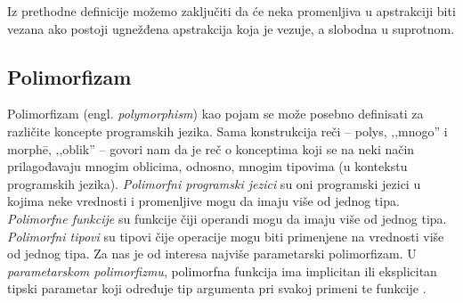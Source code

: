 Iz prethodne definicije možemo zaključiti da će neka promenljiva u apstrakciji biti vezana ako postoji ugnežđena apstrakcija koja je vezuje, a slobodna u suprotnom.

\subsection{Polimorfizam}
\label{subsec:polimorfizam}


Polimorfizam (engl. \textit{polymorphism}) kao pojam se može posebno definisati za različite koncepte programskih jezika. Sama konstrukcija reči -- polys, ‚‚mnogo'' i morph\={e}, ‚‚oblik'' -- govori nam da je reč o konceptima koji se na neki način prilagođavaju mnogim oblicima, odnosno, mnogim tipovima (u kontekstu programskih jezika). \textit{Polimorfni programski jezici} su oni programski jezici u kojima neke vrednosti i promenljive mogu da imaju više od jednog tipa. \textit{Polimorfne funkcije} su funkcije čiji operandi mogu da imaju više od jednog tipa. \textit{Polimorfni tipovi} su tipovi čije operacije mogu biti primenjene na vrednosti više od jednog tipa. Za nas je od interesa najviše parametarski polimorfizam. U \textit{parametarskom polimorfizmu}, polimorfna funkcija ima implicitan ili eksplicitan tipski parametar koji određuje tip argumenta pri svakoj primeni te funkcije \cite{On-Understanding-Types-Data-Abstraction-and-Polymorphism}.

